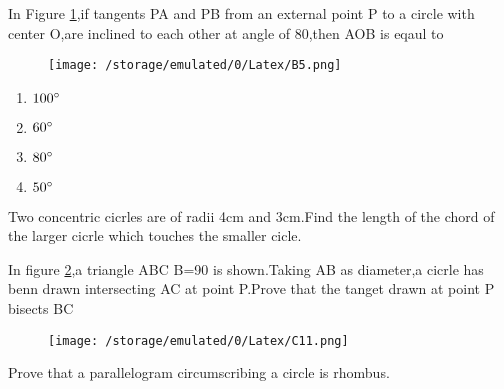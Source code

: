 \documentclass[12pt]{exam}
\author{saikiran}
\begin{document}
\begin{questions}

\question 
	In Figure \ref{fig1},if tangents PA and PB from an external point P to a circle with center O,are inclined to each other at angle of 80\degree,then \angle AOB is eqaul to
\begin{figure}[H]
\centering
\texttt{[image: /storage/emulated/0/Latex/B5.png]}
\caption{}
\label{fig1}
\end{figure}
\begin{enumerate}
	\item $100\degree$
	\item $60\degree$
	\item $80\degree$
	\item $50\degree$
\end{enumerate}

\question 
Two concentric cicrles are of radii 4cm and 3cm.Find the length of the chord of the larger cicrle which touches the smaller cicle.

\question
	In figure \ref{fig2},a triangle ABC \angle B=90 \degree is shown.Taking AB as diameter,a cicrle has benn drawn intersecting AC at point P.Prove that  the tanget drawn at point P bisects BC
\begin{figure}[H]
\centering
\texttt{[image: /storage/emulated/0/Latex/C11.png]}
	\caption{}
	\label{fig2}
\end{figure}
\question 
Prove that a parallelogram circumscribing a circle is rhombus.

\question 
{}


\end{questions}
\end{document}
